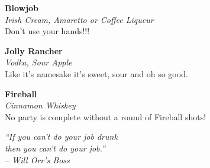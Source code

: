 \documentclass[12pt]{article}
\newcommand{\drink}[3]{
    \begin{center}
        \noindent\large \textbf{#1}\\
        \small \textit{#2}\\
        \normalsize #3\\
        \vspace{8 mm}
    \end{center}
}
\begin{document}
      \drink{Blowjob}{Irish Cream, Amaretto or Coffee Liqueur}{
         Don't use your hands!!!
      }

      \drink{Jolly Rancher}{Vodka, Sour Apple}{
         Like it's namesake it's sweet, sour and oh so good.
      }

      \drink{Fireball}{Cinnamon Whiskey}{
         No party is complete without a round of Fireball shots!
      }

      \vfill
      \begin{center}
      \noindent\textit{
         ``If you can’t do your job drunk \\
            then you can’t do your job.'' \\
            -- Will Orr's Boss
      }
   \end{center}
\end{document}
